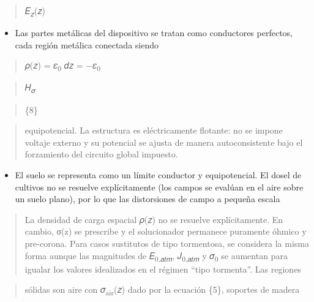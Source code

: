 \documentclass[
]{article}
\providecommand{\tightlist}{%
  \setlength{\itemsep}{0pt}\setlength{\parskip}{0pt}}
\begin{document}
\begin{quote}
𝐸\textsubscript{𝑧}(𝑧)
\end{quote}

\begin{itemize}
\tightlist
\item
  Las partes metálicas del dispositivo se tratan como conductores
  perfectos, cada región metálica conectada siendo
\end{itemize}

\begin{quote}
𝜌(𝑧) = 𝜀\textsubscript{0} 𝑑𝑧 = −𝜀\textsubscript{0}
\end{quote}

\begin{quote}
𝐻\textsubscript{𝜎}
\end{quote}

\begin{quote}
\{8\}
\end{quote}

\begin{quote}
equipotencial. La estructura es eléctricamente flotante: no se impone
voltaje externo y su potencial se ajusta de manera autoconsistente bajo
el forzamiento del circuito global impuesto.
\end{quote}

\begin{itemize}
\tightlist
\item
  El suelo se representa como un límite conductor y equipotencial. El
  dosel de cultivos no se resuelve explícitamente (los campos se evalúan
  en el aire sobre un suelo plano), por lo que las distorsiones de campo
  a pequeña escala
\end{itemize}

\begin{quote}
La densidad de carga espacial 𝜌(𝑧) no se resuelve explícitamente. En
cambio, σ(z) se prescribe y el solucionador permanece puramente óhmico y
pre-corona. Para casos sustitutos de tipo tormentosa, se considera la
misma forma aunque las magnitudes de
\textbar 𝐸\textsubscript{0,𝑎𝑡𝑚}\textbar,
\textbar 𝐽\textsubscript{0,𝑎𝑡𝑚}\textbar{} y 𝜎\textsubscript{0} se
aumentan para igualar los valores idealizados en el régimen ``tipo
tormenta''. Las regiones
\end{quote}

\begin{quote}
sólidas son aire con 𝜎\textsubscript{air}(𝑧) dado por la ecuación \{5\},
soportes de madera
\end{quote}
\end{document}
